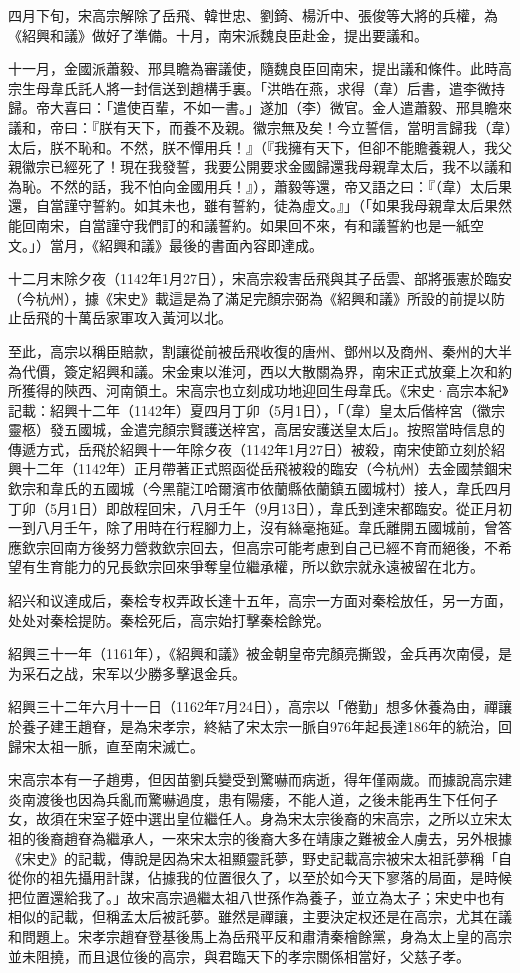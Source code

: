 四月下旬，宋高宗解除了岳飛、韓世忠、劉錡、楊沂中、張俊等大將的兵權，為《紹興和議》做好了準備。十月，南宋派魏良臣赴金，提出要議和。

十一月，金國派蕭毅、邢具瞻為審議使，隨魏良臣回南宋，提出議和條件。此時高宗生母韋氏託人將一封信送到趙構手裏。「洪皓在燕，求得（韋）后書，遣李微持歸。帝大喜曰：「遣使百輩，不如一書。」遂加（李）微官。金人遣蕭毅、邢具瞻來議和，帝曰：『朕有天下，而養不及親。徽宗無及矣！今立誓信，當明言歸我（韋）太后，朕不恥和。不然，朕不憚用兵！』（『我擁有天下，但卻不能贍養親人，我父親徽宗已經死了！現在我發誓，我要公開要求金國歸還我母親韋太后，我不以議和為恥。不然的話，我不怕向金國用兵！』），蕭毅等還，帝又語之曰：『（韋）太后果還，自當謹守誓約。如其未也，雖有誓約，徒為虛文。』」（「如果我母親韋太后果然能回南宋，自當謹守我們訂的和議誓約。如果回不來，有和議誓約也是一紙空文。」）當月，《紹興和議》最後的書面內容即達成。

十二月末除夕夜（1142年1月27日），宋高宗殺害岳飛與其子岳雲、部將張憲於臨安（今杭州），據《宋史》載這是為了滿足完顏宗弼為《紹興和議》所設的前提以防止岳飛的十萬岳家軍攻入黃河以北。

至此，高宗以稱臣賠款，割讓從前被岳飛收復的唐州、鄧州以及商州、秦州的大半為代價，簽定紹興和議。宋金東以淮河，西以大散關為界，南宋正式放棄上次和約所獲得的陝西、河南領土。宋高宗也立刻成功地迎回生母韋氏。《宋史·高宗本紀》記載：紹興十二年（1142年）夏四月丁卯（5月1日），「（韋）皇太后偕梓宮（徽宗靈柩）發五國城，金遣完顏宗賢護送梓宮，高居安護送皇太后」。按照當時信息的傳遞方式，岳飛於紹興十一年除夕夜（1142年1月27日）被殺，南宋使節立刻於紹興十二年（1142年）正月帶著正式照函從岳飛被殺的臨安（今杭州）去金國禁錮宋欽宗和韋氏的五國城（今黑龍江哈爾濱市依蘭縣依蘭鎮五國城村）接人，韋氏四月丁卯（5月1日）即啟程回宋，八月壬午（9月13日），韋氏到達宋都臨安。從正月初一到八月壬午，除了用時在行程腳力上，沒有絲毫拖延。韋氏離開五國城前，曾答應欽宗回南方後努力營救欽宗回去，但高宗可能考慮到自己已經不育而絕後，不希望有生育能力的兄長欽宗回來爭奪皇位繼承權，所以欽宗就永遠被留在北方。

紹兴和议達成后，秦桧专权弄政长達十五年，高宗一方面对秦桧放任，另一方面，处处对秦桧提防。秦桧死后，高宗始打擊秦桧餘党。

紹興三十一年（1161年），《紹興和議》被金朝皇帝完顏亮撕毀，金兵再次南侵，是为采石之战，宋军以少勝多擊退金兵。

紹興三十二年六月十一日（1162年7月24日），高宗以「倦勤」想多休養為由，禪讓於養子建王趙眘，是為宋孝宗，終結了宋太宗一脈自976年起長達186年的統治，回歸宋太祖一脈，直至南宋滅亡。

宋高宗本有一子趙旉，但因苗劉兵變受到驚嚇而病逝，得年僅兩歲。而據說高宗建炎南渡後也因為兵亂而驚嚇過度，患有陽痿，不能人道，之後未能再生下任何子女，故須在宋室子姪中選出皇位繼任人。身為宋太宗後裔的宋高宗，之所以立宋太祖的後裔趙眘為繼承人，一來宋太宗的後裔大多在靖康之難被金人虜去，另外根據《宋史》的記載，傳說是因為宋太祖顯靈託夢，野史記載高宗被宋太祖託夢稱「自從你的祖先攝用計謀，佔據我的位置很久了，以至於如今天下寥落的局面，是時候把位置還給我了。」故宋高宗過繼太祖八世孫作為養子，並立為太子；宋史中也有相似的記載，但稱孟太后被託夢。雖然是禪讓，主要決定权还是在高宗，尤其在議和問題上。宋孝宗趙眘登基後馬上為岳飛平反和肅清秦檜餘黨，身為太上皇的高宗並未阻撓，而且退位後的高宗，與君臨天下的孝宗關係相當好，父慈子孝。


